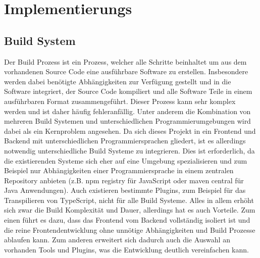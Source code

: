 \chapter{Implementierungs}\label{chapter5}

\section{Build System}
Der Build Prozess ist ein Prozess, welcher alle Schritte beinhaltet um aus dem vorhandenen Source Code eine ausführbare Software zu erstellen. Insbesondere werden dabei benötigte Abhängigkeiten zur Verfügung gestellt und in die Software integriert, der Source Code kompiliert und alle Software Teile in einem ausführbaren Format zusammengeführt. Dieser Prozess kann sehr komplex werden und ist daher häufig fehleranfällig. Unter anderem die Kombination von mehreren Build Systemen und unterschiedlichen Programmierumgebungen wird dabei als ein Kernproblem angesehen\cite{buildSystemProblem}. Da sich dieses Projekt in ein Frontend und Backend mit unterschiedlichen Programmiersprachen gliedert, ist es allerdings notwendig unterschiedliche Build Systeme zu integrieren. Dies ist erforderlich, da die existierenden Systeme sich eher auf eine Umgebung spezialisieren und zum Beispiel nur Abhängigkeiten einer Programmiersprache in einem zentralen Repository anbieten (z.B. npm registry für JavaScript oder maven central für Java Anwendungen). Auch existieren bestimmte Plugins, zum Beispiel für das Transpilieren von TypeScript, nicht für alle Build Systeme. Alles in allem erhöht sich zwar die Build Komplexität und Dauer, allerdings hat es auch Vorteile. Zum einen führt es dazu, dass das Frontend vom Backend vollständig isoliert ist und die reine Frontendentwicklung ohne unnötige Abhängigkeiten und Build Prozesse ablaufen kann. Zum anderen erweitert sich dadurch auch die Auswahl an vorhanden Tools und Plugins, was die Entwicklung deutlich vereinfachen kann.

